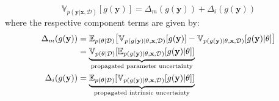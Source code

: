 \begin{equation}
\mathbb{V}_{p(\mathbf{y}|\mathbf{x},\mathcal{D})} [g(\mathbf{y})] = \Delta_{m}(g(\mathbf{y})) + \Delta_{i}(g(\mathbf{y}))  
\label{eq:variance_decomposition}
\end{equation}
where the respective component terms are given by:
\begin{align}
\Delta_{m}(g(\mathbf{y})) & = \mathbb{E}_{p(\theta|\mathcal{D})}\big{[}\mathbb{V}_{p(g(\mathbf{y})|\theta,\mathbf{x},\mathcal{D})}[g(\mathbf{y})]-\mathbb{V}_{p(g(\mathbf{y})|\theta,\mathbf{x},\mathcal{D})}[g(\mathbf{y})|\theta]\big{]} \\
&=\underbrace{\mathbb{V}_{p(\theta|\mathcal{D})}[\mathbb{E}_{p(g(\mathbf{y})|\theta,\mathbf{x},\mathcal{D})}[g(\mathbf{y})|\theta]]}_{\text{propagated parameter uncertainty}} 
\\
\Delta_{i}(g(\mathbf{y}))  &=   \underbrace{\mathbb{E}_{p(\theta|\mathcal{D})}[\mathbb{V}_{p(g(\mathbf{y})|\theta,\mathbf{x},\mathcal{D})}[g(\mathbf{y})|\theta]]}_{\text{propagated intrinsic uncertainty}} 
\end{align}
